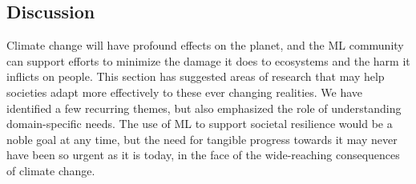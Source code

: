 \documentclass[11pt]{report}
\begin{document}
\subsection{Discussion}

Climate change will have profound effects on the planet, and
the ML community can support efforts to minimize the damage it does to
ecosystems and the harm it inflicts on people. This section has suggested areas
of research that may help societies adapt more effectively to these ever
changing realities. We have identified a few recurring themes, but also
emphasized the role of understanding domain-specific needs. The use of ML to
support societal resilience would be a noble goal at any time, but the need for
tangible progress towards it may never have been so urgent as it is today, in the
face of the wide-reaching consequences of climate change.
\end{document}
